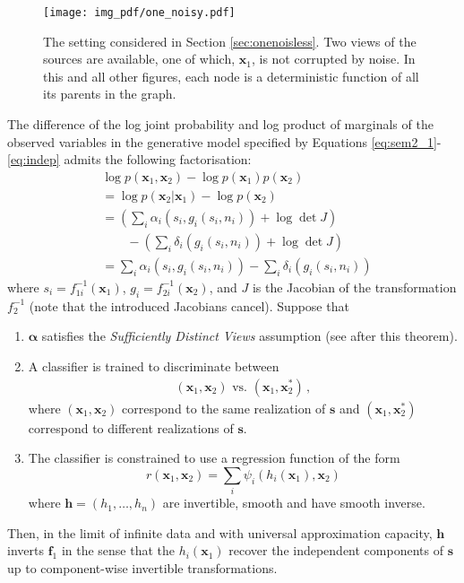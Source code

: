 \begin{figure}[t!]
	\centering
	\texttt{[image: img\_pdf/one\_noisy.pdf]}
	\caption{The setting considered in Section \ref{sec:onenoisless}. Two views of the sources are available, one of which, $\bm{x}_1$, is not corrupted by noise. In this and all other figures, each node is a deterministic function of all its parents in the graph.
	}
	\label{fig:generalized_hsr_basic}
\end{figure}

\medskip

\begin{theorem}
	\label{thm:noiseless1}
	The difference of the log joint probability and log product of marginals of the observed variables in the generative model specified by Equations \ref{eq:sem2_1}-\ref{eq:indep} admits the following factorisation:
	\begin{align}
	&\log p(\bm{x}_1, \bm{x}_2) - \log p(\bm{x}_1) p(\bm{x}_2) \nonumber \\
	&= \log p(\bm{x}_2 | \bm{x}_1) - \log p(\bm{x}_2) \nonumber\\
	&= \left(\sum_i \alpha_i(s_{i}, g_i(s_i, n_i)) + \log \det J \right) \nonumber\\
	&\qquad - \left( \sum_i \delta_i(g_i(s_i, n_i)) + \log \det J\right) \nonumber\\
	&= \sum_i \alpha_i(s_{i}, g_i(s_i, n_i)) - \sum_i \delta_i(g_i(s_i, n_i))\label{eq:logdens_noiesless_1} \,
	\end{align}
	where $s_i=f^{-1}_{1i}(\bm{x}_1)$, $g_i=f^{-1}_{2i}(\bm{x}_2)$,
	and $J$ is the Jacobian of the transformation $f^{-1}_2$ (note that the introduced Jacobians cancel).
	Suppose that
	\begin{enumerate}
		\item $\bm{\alpha}$ satisfies the \emph{Sufficiently Distinct Views} assumption (see after this theorem).
		\item A classifier is trained to discriminate between
		\begin{align*}
		(\bm{x}_{1},\bm{x}_{2}) \text{ vs. } (\bm{x}_{1},\bm{x}_{2}^{*})\,,
		\end{align*}
		where $(\bm{x}_{1},\bm{x}_{2})$ correspond to the same realization of $\bm{s}$ and $(\bm{x}_{1},\bm{x}_{2}^{*})$ correspond to different realizations of $\bm{s}$.
		\item The classifier is constrained to use a regression function of the form
		\begin{equation*}
		r(\bm{x}_{1},\bm{x}_{2})=\sum_{i}\psi_{i}(h_{i}(\bm{x}_{1}),\bm{x}_{2})
		\end{equation*}
		where $\bm{h} =(h_{1}, \ldots, h_{n})$  are invertible, smooth and have smooth inverse.
	\end{enumerate}
	
	Then, in the limit of infinite data and with universal approximation capacity, $\bm{h}$ inverts $\bm{f}_1$ in the sense that the $h_{i}(\bm{x}_1)$ recover the independent  components of $\bm{s}$ up to component-wise invertible transformations.
\end{theorem}
